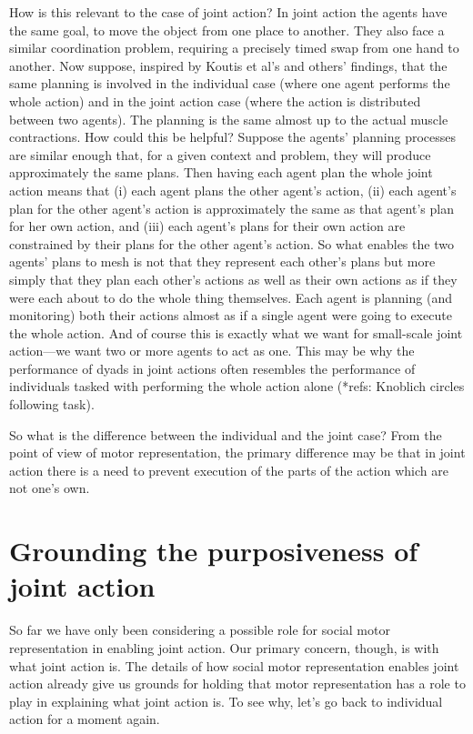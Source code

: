 \documentclass[12pt,\papersize]{extarticle}
\begin{document}
How is this relevant to the case of joint action?
In joint action the agents have the same goal, to move the object from one place to another.
They also face a similar coordination problem, requiring a precisely timed swap from one hand to another.
Now suppose, 
inspired by Koutis et al’s and others' findings,
that the same planning is involved in the individual case (where one agent performs the whole action) and in the joint action case (where the action is distributed between two agents).
The planning is the same almost up to the actual muscle contractions.
How could this be helpful?
Suppose the agents' planning processes are similar enough that, for a given context and problem, they will produce approximately the same plans.
Then having each agent plan the whole joint action means that (i) each agent plans the other agent's action,
(ii) each agent's plan for the other agent's action is approximately the same as that agent's plan for her own action,
and 
(iii) each  agent's plans for their own action are constrained by their plans for the other agent's action.
So what enables the two agents' plans to mesh is not that they represent each other's plans but more simply that they plan each other's actions as well as their own actions as if they were each about to do the whole thing themselves.
Each agent is planning (and monitoring) both their actions almost as if a single agent were going to execute the whole action.
And of course this is exactly what we want for small-scale joint action---we want two or more agents to act as one.
This may be why the performance of dyads in joint actions often resembles the performance of individuals tasked with performing the whole action alone (*refs: Knoblich circles following task).

So what is the difference between the individual and the joint case?  From the point of view of motor representation, the primary difference may be that in joint action there is a need to prevent execution of the parts of the action which are not one’s own.



\section{Grounding the purposiveness of joint action}
So far we have only been considering a possible role for social motor representation in enabling joint action.  
Our primary concern, though, is with what joint action is.
The details of how 
social motor representation enables joint action
 already give us grounds for holding that motor representation has a role to play in explaining what joint action is.
To see why,
let’s go back to individual action for a moment again.
\end{document}
